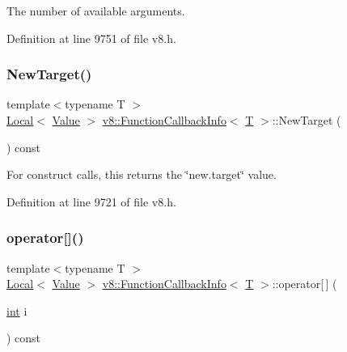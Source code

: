 The number of available arguments. 

Definition at line 9751 of file v8.\+h.

\mbox{\label{classv8_1_1FunctionCallbackInfo_aa04f4c5c984db26a90b591f34550e6fa}} 
\subsubsection{\texorpdfstring{New\+Target()}{NewTarget()}}
{\footnotesize\ttfamily template$<$typename T $>$ \\
\mbox{\hyperlink{classv8_1_1Local}{Local}}$<$ \mbox{\hyperlink{classv8_1_1Value}{Value}} $>$ \mbox{\hyperlink{classv8_1_1FunctionCallbackInfo}{v8\+::\+Function\+Callback\+Info}}$<$ \mbox{\hyperlink{classv8_1_1internal_1_1torque_1_1T}{T}} $>$\+::New\+Target (\begin{DoxyParamCaption}{ }\end{DoxyParamCaption}) const}

For construct calls, this returns the \char`\"{}new.\+target\char`\"{} value. 

Definition at line 9721 of file v8.\+h.

\mbox{\label{classv8_1_1FunctionCallbackInfo_a77dce5cad7b198c4181a522e9e0ab10f}} 
\subsubsection{\texorpdfstring{operator[]()}{operator[]()}}
{\footnotesize\ttfamily template$<$typename T $>$ \\
\mbox{\hyperlink{classv8_1_1Local}{Local}}$<$ \mbox{\hyperlink{classv8_1_1Value}{Value}} $>$ \mbox{\hyperlink{classv8_1_1FunctionCallbackInfo}{v8\+::\+Function\+Callback\+Info}}$<$ \mbox{\hyperlink{classv8_1_1internal_1_1torque_1_1T}{T}} $>$\+::operator\mbox{[}$\,$\mbox{]} (\begin{DoxyParamCaption}\item[{\mbox{\hyperlink{classint}{int}}}]{i }\end{DoxyParamCaption}) const}

